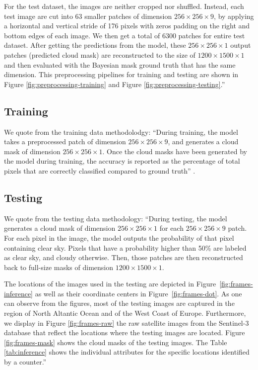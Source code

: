 \documentclass[sigplan,screen]{acmart}
\begin{document}
For the test dataset, the images are neither cropped nor shuffled. Instead, each test image are cut into 63 smaller patches of dimension $256 \times 256 \times 9$, by applying a horizontal and vertical stride of 176 pixels with zeros padding on the right and bottom edges of each image. We then get a total of $6300$ patches for entire test dataset. After getting the predictions from the model, these $256 \times 256 \times 1$ output patches (predicted cloud mask) are reconstructed to the size of $1200 \times 1500 \times 1$ and then evaluated with the Bayesian mask ground truth that has the same dimension. This preprocessing pipelines for training and testing are shown in Figure \ref{fig:preprocessing-training} and Figure \ref{fig:preprocessing-testing}.''

\subsection{Training}

We quote from \cite{las-2023-cloudmask-related} the training data methodolodgy:
``During training, the model takes a preprocessed patch of dimension $256 \times 256 \times 9$, and generates a cloud mask of dimension $256 \times 256 \times 1$. Once the cloud masks have been generated by the model during training, the accuracy is reported as the percentage of total pixels that are correctly classified compared to ground truth'' \cite{las-2023-cloudmask-related}. 

\subsection{Testing}

We quote from \cite{las-2023-cloudmask-related} the testing data methodology:
``During testing, the model generates a cloud mask of dimension $256 \times 256 \times 1$ for each $256 \times 256 \times 9$ patch. For each pixel in the image, the model outputs the probability of that pixel containing clear sky. Pixels that have a probability higher than 50\% are labeled as clear sky, and cloudy otherwise. Then, those patches are then reconstructed back to full-size masks of dimension $1200 \times 1500 \times 1$. 

The locations of the images used in the testing are depicted in Figure~\ref{fig:frames-inference} as well as their coordinate centers in Figure~\ref{fig:frames-dot}. As one can observe from the figures, most of the testing images are captured in the region of North Altantic Ocean and of the West Coast of Europe.
Furthermore, we display in Figure \ref{fig:frames-raw} the raw satellite images from the Sentinel-3 database that reflect the locations where the testing images are located. Figure \ref{fig:frames-mask} shows the cloud masks of the testing images.
The Table \ref{tab:inference} shows the individual attributes for the specific locations identified by a counter.''
\end{document}
